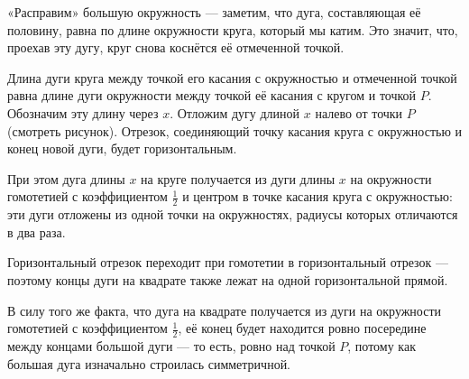 \begin{itemize}
\itA «Расправим» большую окружность — заметим, что дуга, составляющая её половину, равна по длине окружности круга, который мы катим. Это значит, что, проехав эту дугу, круг снова коснётся её отмеченной точкой.

\begin{center}
\end{center}

\itB Длина дуги круга между точкой его касания с окружностью и отмеченной точкой равна длине дуги окружности между точкой её касания с кругом и точкой $P$. Обозначим эту длину через $x$. Отложим дугу длиной $x$ налево от точки $P$ (смотреть рисунок). Отрезок, соединяющий точку касания круга с окружностью и конец новой дуги, будет горизонтальным.

При этом дуга длины $x$ на круге получается из дуги длины $x$ на окружности гомотетией с коэффициентом $\tfrac{1}{2}$ и центром в точке касания круга с окружностью: эти дуги отложены из одной точки на окружностях, радиусы которых отличаются в два раза.

Горизонтальный отрезок переходит при гомотетии в горизонтальный отрезок — поэтому концы дуги на квадрате также лежат на одной горизонтальной прямой.

\itC В силу того же факта, что дуга на квадрате получается из дуги на окружности гомотетией с коэффициентом $\tfrac{1}{2}$, её конец будет находится ровно посередине между концами большой дуги — то есть, ровно над точкой $P$, потому как большая дуга изначально строилась симметричной.
\end{itemize}